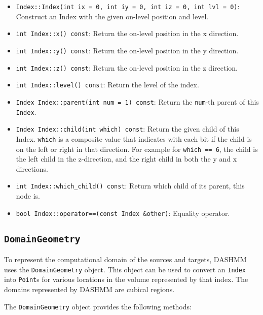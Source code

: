 \begin{itemize}
  \item \texttt{Index::Index(int ix = 0, int iy = 0, int iz = 0, int lvl = 0)}:
    Construct an Index with the given on-level position and level.
  \item \texttt{int Index::x() const}: Return the on-level position in the
    x direction.
  \item \texttt{int Index::y() const}: Return the on-level position in the
    y direction.
  \item \texttt{int Index::z() const}: Return the on-level position in the
    z direction.
  \item \texttt{int Index::level() const}: Return the level of the index.
  \item \texttt{Index Index::parent(int num = 1) const}: Return the
    \texttt{num}-th parent of this \texttt{Index}.
  \item \texttt{Index Index::child(int which) const}: Return the given child
    of this Index. \texttt{which} is a composite value that indicates with
    each bit if the child is on the left or right in that direction. For
    example for \texttt{which == 6}, the child is the left child in the
    z-direction, and the right child in both the y and x directions.
  \item \texttt{int Index::which\_child() const}: Return which child of its
    parent, this node is.
  \item \texttt{bool Index::operator==(const Index \&other)}: Equality operator.
\end{itemize}

\subsection{\texttt{DomainGeometry}}

To represent the computational domain of the sources and targets, DASHMM
uses the \texttt{DomainGeometry} object. This object can be used to convert
an \texttt{Index} into \texttt{Point}s for various locations in the volume
represented by that index. The domains represented by DASHMM are cubical
regions.

The \texttt{DomainGeometry} object provides the following methods:

